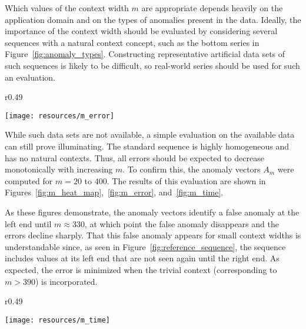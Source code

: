 Which values of the context width $m$ are appropriate depends heavily on the application domain and on the types of anomalies present in the data. Ideally, the importance of the context width should be evaluated by considering several sequences with a natural context concept, such as the bottom series in Figure~\ref{fig:anomaly_types}. Constructing representative artificial data sets of such sequences is likely to be difficult, so real-world series should be used for such an evaluation.

\begin{wrapfigure}{r}{0.49\textwidth} \vspace{-20pt}
    \vspace{-10pt}
    \begin{center}
        \texttt{[image: resources/m\_error]}
    \end{center}
    \vspace{-20pt}
    \caption{\small{Errors of the anomaly vectors $A_m$.}}
    \vspace{-20pt}
\label{fig:m_error}
\end{wrapfigure}

While such data sets are not available, a simple evaluation on the available data can still prove illuminating. The standard sequence is highly homogeneous and has no natural contexts. Thus, all errors should be expected to decrease monotonically with increasing $m$. To confirm this, the anomaly vectors $A_m$ were computed for $m = 20$ to $400$. The results of this evaluation are shown in Figures~\ref{fig:m_heat_map},~\ref{fig:m_error}, and~\ref{fig:m_time}.

As these figures demonstrate, the anomaly vectors identify a false anomaly at the left end until $m \approx 330$, at which point the false anomaly disappears and the errors decline sharply. That this false anomaly appears for small context widths is understandable since, as seen in Figure~\ref{fig:reference_sequence}, the sequence includes values at its left end that are not seen again until the right end. As expected, the error is minimized when the trivial context (corresponding to $m > 390$) is incorporated.

\begin{wrapfigure}{r}{0.49\textwidth}
    \vspace{-30pt}
    \begin{center}
        \texttt{[image: resources/m\_time]}
    \end{center}
    \vspace{-20pt}
    \caption{\small{Evaluation times of the anomaly vectors $A_m$.}}
    \vspace{-20pt}
\label{fig:m_time}
\end{wrapfigure}


